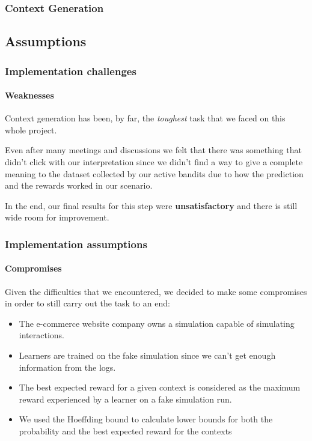 \documentclass[11pt]{beamer}
\begin{document}

\begin{frame}

\frametitle{Context Generation}
\framesubtitle{}


\end{frame}


\subsection{Assumptions}


\begin{frame}

\frametitle{Implementation challenges}
\framesubtitle{Weaknesses}

Context generation has been, by far, the \textit{toughest} task that we faced on this whole project.

Even after many meetings and discussions we felt that there was something that didn't click with our interpretation since we didn't find a way to give a complete meaning to the dataset collected by our active bandits due to how the prediction and the rewards worked in our scenario.

In the end, our final results for this step were \textbf{unsatisfactory} and there is still wide room for improvement.

\end{frame}


\begin{frame}

\frametitle{Implementation assumptions}
\framesubtitle{Compromises}

Given the difficulties that we encountered, we decided to make some compromises in order to still carry out the task to an end:

\begin{itemize}[label={-}]
    \item The e-commerce website company owns a simulation capable of simulating interactions.
    \item Learners are trained on the fake simulation since we can't get enough information from the logs.
    \item The best expected reward for a given context is considered as the maximum reward experienced by a learner on a fake simulation run.
    \item We used the Hoeffding bound to calculate lower bounds for both the probability and the best expected reward for the contexts
\end{itemize}

\end{frame}
\end{document}
